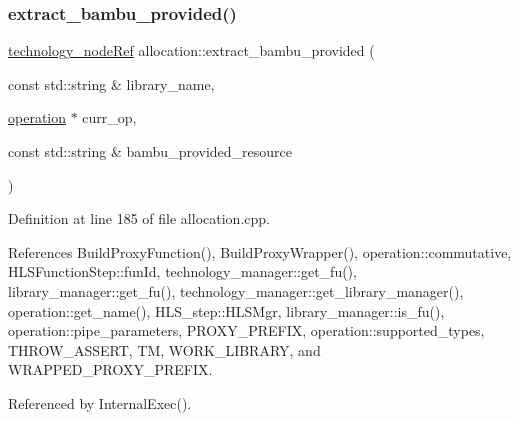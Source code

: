 \mbox{\label{classallocation_a24b901da7ff60e973feddb65b2c7d23c}} 
\subsubsection{\texorpdfstring{extract\+\_\+bambu\+\_\+provided()}{extract\_bambu\_provided()}}
{\footnotesize\ttfamily \hyperlink{technology__node_8hpp_a33dd193b7bd6b987bf0d8a770a819fa7}{technology\+\_\+node\+Ref} allocation\+::extract\+\_\+bambu\+\_\+provided (\begin{DoxyParamCaption}\item[{const std\+::string \&}]{library\+\_\+name,  }\item[{\hyperlink{structoperation}{operation} $\ast$}]{curr\+\_\+op,  }\item[{const std\+::string \&}]{bambu\+\_\+provided\+\_\+resource }\end{DoxyParamCaption})\hspace{0.3cm}{\ttfamily [protected]}}



Definition at line 185 of file allocation.\+cpp.



References Build\+Proxy\+Function(), Build\+Proxy\+Wrapper(), operation\+::commutative, H\+L\+S\+Function\+Step\+::fun\+Id, technology\+\_\+manager\+::get\+\_\+fu(), library\+\_\+manager\+::get\+\_\+fu(), technology\+\_\+manager\+::get\+\_\+library\+\_\+manager(), operation\+::get\+\_\+name(), H\+L\+S\+\_\+step\+::\+H\+L\+S\+Mgr, library\+\_\+manager\+::is\+\_\+fu(), operation\+::pipe\+\_\+parameters, P\+R\+O\+X\+Y\+\_\+\+P\+R\+E\+F\+IX, operation\+::supported\+\_\+types, T\+H\+R\+O\+W\+\_\+\+A\+S\+S\+E\+RT, TM, W\+O\+R\+K\+\_\+\+L\+I\+B\+R\+A\+RY, and W\+R\+A\+P\+P\+E\+D\+\_\+\+P\+R\+O\+X\+Y\+\_\+\+P\+R\+E\+F\+IX.



Referenced by Internal\+Exec().

